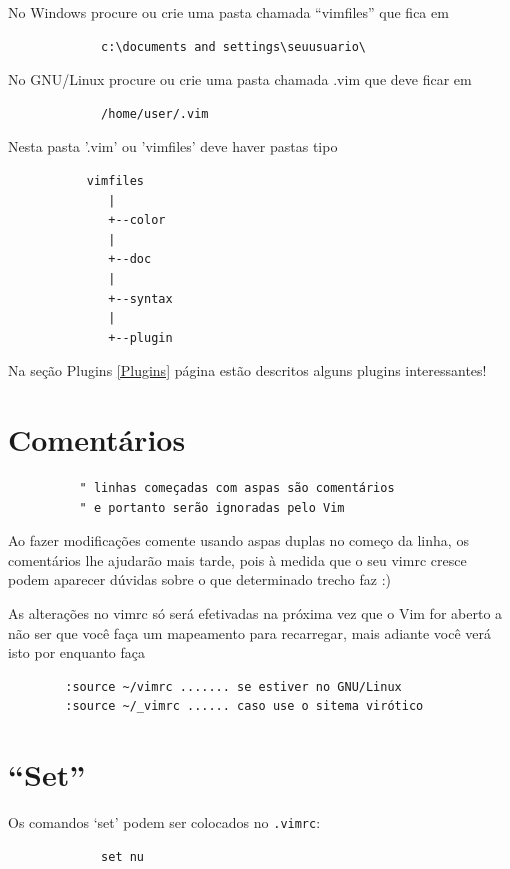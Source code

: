 \documentclass[10pt,a4paper,openany]{book}
\begin{document}
No Windows procure ou crie uma pasta chamada ``vimfiles'' que fica em

\begin{verbatim}
			 c:\documents and settings\seuusuario\
\end{verbatim}

No GNU/Linux procure ou crie uma pasta chamada .vim que deve ficar em

\begin{verbatim}
			 /home/user/.vim
\end{verbatim}

Nesta pasta '.vim' ou 'vimfiles' deve haver pastas tipo

\begin{verbatim}
		   vimfiles
			  |
			  +--color
			  |
			  +--doc
			  |
			  +--syntax
			  |
			  +--plugin
\end{verbatim}

Na seção Plugins \ref{Plugins} página \pageref{Plugins}
estão descritos alguns plugins interessantes!

\section{Comentários }
\label{Comentários }

\begin{verbatim}
		  " linhas começadas com aspas são comentários
		  " e portanto serão ignoradas pelo Vim
\end{verbatim}

Ao fazer modificações comente usando aspas duplas no começo da linha,
os comentários lhe ajudarão mais tarde, pois à medida que o seu vimrc
cresce podem aparecer dúvidas sobre o que determinado trecho faz :)


As alterações no vimrc só será efetivadas na próxima vez que o Vim for aberto
a não ser que você faça um mapeamento para recarregar, mais adiante você verá isto
por enquanto faça

\begin{verbatim}
		:source ~/vimrc ....... se estiver no GNU/Linux
		:source ~/_vimrc ...... caso use o sitema virótico
\end{verbatim}

\section{``Set''}
\label{``Set''}
Os comandos `set' podem ser colocados no \verb|.vimrc|:

\begin{verbatim}
			 set nu
\end{verbatim}
\end{document}

